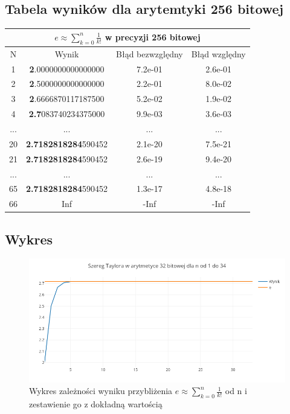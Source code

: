 \documentclass{article}
\begin{document}
\subsection{Tabela wyników dla arytemtyki 256 bitowej}
\begin{center}
\begin{tabular}{||c||c|c|c||} \hline
\multicolumn{4}{||c||}{$e \approx \sum_{k=0}^{n} \frac{1}{k!}$ w precyzji 256 bitowej} \\ \hline
N & Wynik & Błąd bezwzględny & Błąd względny\\ \hline
1 & \textbf{2}.0000000000000000  & 7.2e-01  & 2.6e-01\\
\hline
2  & \textbf{2}.5000000000000000  & 2.2e-01  & 8.0e-02\\
\hline
3  & \textbf{2}.6666870117187500  & 5.2e-02  & 1.9e-02\\
\hline
4  & \textbf{2.7}083740234375000  & 9.9e-03  & 3.6e-03\\
\hline
... & ...  & ...  & ...\\
\hline
20  &  \textbf{2.7182818284}590452  & 2.1e-20  & 7.5e-21\\
\hline
21  & \textbf{2.7182818284}590452  & 2.6e-19  & 9.4e-20\\
\hline
... & ...  & ...  & ...\\
\hline
65  & \textbf{2.7182818284}590452  & 1.3e-17  & 4.8e-18\\
\hline
66  & Inf  & -Inf  & -Inf\\
\hline
\end{tabular}
\end{center}
\newpage
\subsection{Wykres}

\begin{figure}[ht]
  \begin{center}
  \includegraphics[width=15cm]{sz}
  \end{center}
  \caption{Wykres zależności wyniku przybliżenia $e \approx \sum_{k=0}^{n} \frac{1}{k!}$ od n i zestawienie go z dokładną wartością}
  \label{fig:rysunek}
\end{figure}
\end{document}
